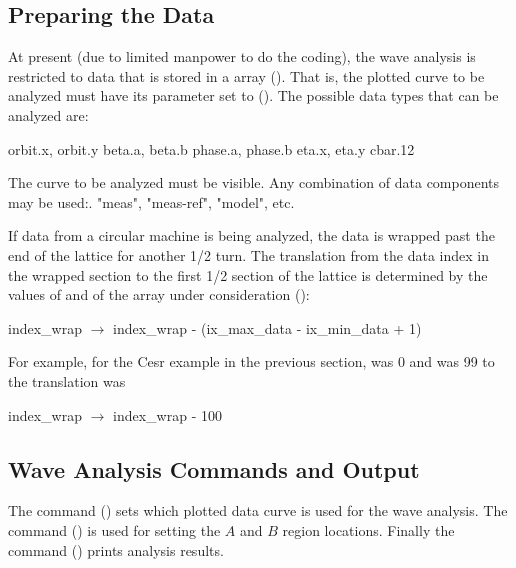 \subsection{Preparing the Data} 
\label{ss:wave.data}

At present (due to limited manpower to do the
coding), the wave analysis is restricted to data that is stored in a
 array (). That is, the plotted curve to be
analyzed must have its  parameter set to
 (). The possible data types that
can be analyzed are:
\begin{example}
  orbit.x, orbit.y
  beta.a,  beta.b
  phase.a, phase.b
  eta.x, eta.y
  cbar.12
\end{example}
The curve to be analyzed must be visible. Any combination of data
components may be used:. "meas", "meas-ref", "model", etc.

If data from a circular machine is being analyzed, the data is wrapped
past the end of the lattice for another 1/2 turn. The translation from
the data index in the wrapped section to the first 1/2 section of the
lattice is determined by the values of  and
 of the  array under consideration
():
\begin{example}
  index_wrap \(\longrightarrow\) index_wrap - (ix_max_data - ix_min_data + 1)
\end{example}
For example, for the Cesr example in the previous section,
 was 0 and  was 99 to the translation
was
\begin{example}
  index_wrap \(\longrightarrow\) index_wrap - 100
\end{example}

\subsection{Wave Analysis Commands and Output}
\label{ss:wave.cmd.out}

The  command () sets which plotted data curve
is used for the wave analysis. The  command () 
is used for setting the $A$ and $B$ region locations. Finally the 
 command () prints analysis results. 

